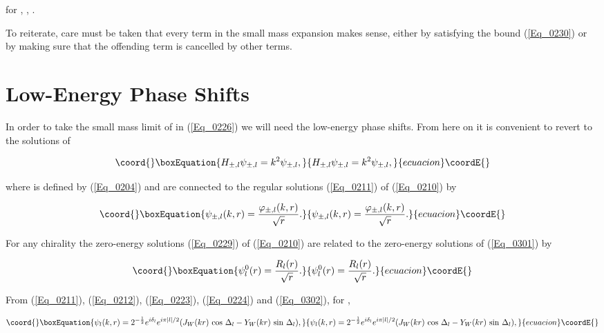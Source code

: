 \documentclass[a4paper,twocolumn,showpacs,preprintnumbers,amsmath,amssymb]{revtex4}
\providecommand{\half}{\frac{1}{2}}
\begin{document}
\noindent
for \coordHE{}, \coordHE{}, \coordHE{}.

To reiterate, care must be taken that every term in the small
mass expansion makes sense, either by satisfying the bound
(\ref{Eq_0230}) or by making sure that the offending term is cancelled
by other terms.



\section{\label{Sec_SecIII}
Low-Energy Phase Shifts}

In order to take the small mass limit of \coordHE{} in (\ref{Eq_0226}) we
will need the low-energy phase shifts. From here on it is convenient
to revert to the solutions of

\begin{equation}\coord{}\boxEquation{
\label{Eq_0301}
H_{\pm,l} \psi_{\pm,l} = k^2 \psi_{\pm,l},
}{
H_{\pm,l} \psi_{\pm,l} = k^2 \psi_{\pm,l},
}{ecuacion}\coordE{}\end{equation}

\noindent
where \coordHE{} is defined by (\ref{Eq_0204}) and \coordHE{} are
connected to the regular solutions (\ref{Eq_0211}) of (\ref{Eq_0210}) by

\begin{equation}\coord{}\boxEquation{
\label{Eq_0302}
\psi_{\pm,l}(k,r) = \frac{\varphi_{\pm,l}(k,r)}{\sqrt{r}}.
}{
\psi_{\pm,l}(k,r) = \frac{\varphi_{\pm,l}(k,r)}{\sqrt{r}}.
}{ecuacion}\coordE{}\end{equation}

\noindent
For any chirality the zero-energy solutions (\ref{Eq_0229}) of
(\ref{Eq_0210}) are related to the zero-energy solutions \coordHE{} of
(\ref{Eq_0301}) by

\begin{equation}\coord{}\boxEquation{
\label{Eq_0303}
\psi^0_l(r) = \frac{R_l(r)}{\sqrt{r}}.
}{
\psi^0_l(r) = \frac{R_l(r)}{\sqrt{r}}.
}{ecuacion}\coordE{}\end{equation}

From (\ref{Eq_0211}), (\ref{Eq_0212}), (\ref{Eq_0223}),
(\ref{Eq_0224}) and (\ref{Eq_0302}), for \coordHE{},

\begin{widetext}
\begin{equation}\coord{}\boxEquation{
\label{Eq_0304}
\psi_l(k,r) = 2^{-\half} e^{i\delta_l} e^{i\pi|l|/2}
  (J_W(kr) \, \cos \, \Delta_l - Y_W(kr) \, \sin \, \Delta_l),
}{
\psi_l(k,r) = 2^{-\half} e^{i\delta_l} e^{i\pi|l|/2}
  (J_W(kr) \, \cos \, \Delta_l - Y_W(kr) \, \sin \, \Delta_l),
}{ecuacion}\coordE{}\end{equation}
\end{widetext}
\end{document}
